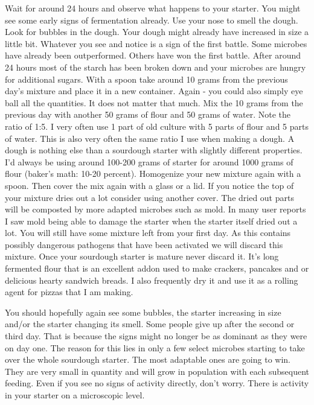 Wait for around 24 hours and observe what happens to your starter.
You might see some early signs of fermentation already. Use your nose
to smell the dough. Look for bubbles in the dough. Your dough
might already have increased in size a little bit. Whatever
you see and notice is a sign of the first battle. Some microbes
have already been outperformed. Others have won the first battle.
After around 24 hours most of the starch has been broken down
and your microbes are hungry for additional sugars. With a spoon
take around 10 grams from the previous day's mixture and place
it in a new container. Again - you could also simply eye ball
all the quantities. It does not matter that much. Mix the 10
grams from the previous day with another 50 grams of flour
and 50 grams of water. Note the ratio of 1:5. I very often use
1 part of old culture with 5 parts of flour and 5 parts of water.
This is also very often the same ratio I use when making a dough.
A dough is nothing else than a sourdough starter with slightly different
properties. I'd always be using around 100-200 grams of starter
for around 1000 grams of flour (baker's math: 10-20 percent).
Homogenize your new mixture again with a spoon. Then cover
the mix again with a glass or a lid. If you notice the top of
your mixture dries out a lot consider using another cover. The
dried out parts will be composted by more adapted microbes such as
mold. In many user reports I saw mold being able to damage
the starter when the starter itself dried out a lot. You will
still have some mixture left from your first day. As this contains
possibly dangerous pathogens that have been activated we will discard
this mixture. Once your sourdough starter is mature never
discard it. It's long fermented flour that is an excellent addon
used to make crackers, pancakes and or delicious hearty sandwich
breads. I also frequently dry it and use it as a rolling agent
for pizzas that I am making.

You should hopefully again see some bubbles, the starter increasing
in size and/or the starter changing its smell. Some people give
up after the second or third day. That is because the signs might no longer
be as dominant as they were on day one. The reason for this lies in only a few
select microbes starting to take over the whole sourdough starter. The most
adaptable ones are going to win. They are very small in quantity and will
grow in population with each subsequent feeding. Even if you see no signs
of activity directly, don't worry. There is activity in
your starter on a microscopic level.

